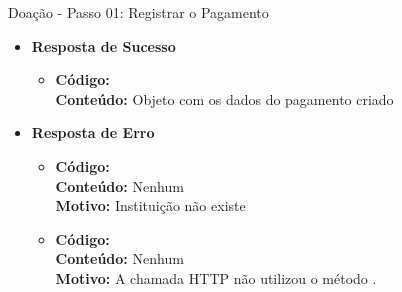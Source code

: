 \begin{caixa}{Doação - Passo 01: Registrar o Pagamento}{}
\begin{itemize}
\item \textbf{Resposta de Sucesso}
	\begin{itemize}
		\item \textbf{Código:}  \\ \textbf{Conteúdo:} Objeto  com os dados do pagamento criado
	\end{itemize}

\item \textbf{Resposta de Erro}
	\begin{itemize}
		\item \textbf{Código:}  \\ \textbf{Conteúdo:} Nenhum \\ \textbf{Motivo:} Instituição não existe
        \item \textbf{Código:}  \\ \textbf{Conteúdo:} Nenhum \\ \textbf{Motivo:} A chamada HTTP não utilizou o método .
	\end{itemize}

\end{itemize}
\end{caixa}



